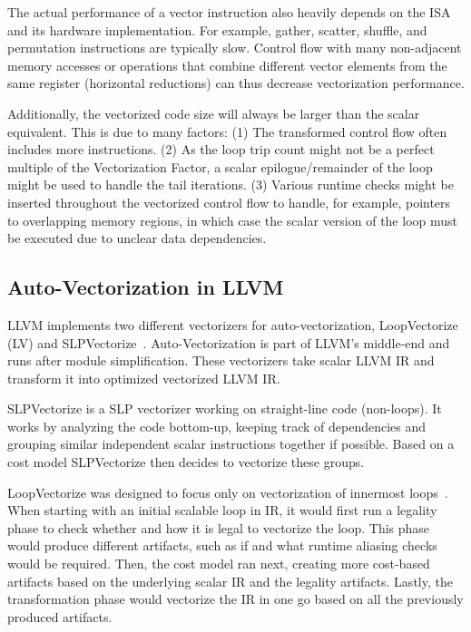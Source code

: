 \documentclass[sigplan,11pt,nonacm]{acmart}
\begin{document}
The actual performance of a vector instruction also heavily depends on the ISA and its 
hardware implementation. 
For example, gather, scatter, 
shuffle, and permutation instructions are typically slow. Control flow with many 
non-adjacent memory accesses or 
operations that combine different vector elements from the same register (horizontal reductions) can thus 
decrease vectorization performance.

Additionally, the vectorized code size will always be larger than the scalar equivalent. This is
due to many factors: (1) The transformed control flow often includes more instructions.
(2) As the loop trip count might not be a perfect multiple of the Vectorization Factor, a scalar
epilogue/remainder of the loop might be used to handle the tail iterations. (3) Various runtime
checks might be inserted throughout the vectorized control flow to handle, for example, pointers 
to overlapping memory regions, in which case the scalar version of the loop must be executed due to 
unclear data dependencies.

\subsection{Auto-Vectorization in LLVM}
LLVM implements two different vectorizers for auto-vectorization, LoopVectorize (LV)
and SLPVectorize~\cite{llvmvec,llvmhistorystate}. Auto-Vectorization is part of LLVM's 
middle-end and runs after module simplification.
These vectorizers take scalar LLVM IR and transform it into optimized vectorized 
LLVM IR.

SLPVectorize is a SLP vectorizer working on straight-line code (non-loops). It works by analyzing
the code bottom-up, keeping track of dependencies and grouping similar independent scalar instructions
together if possible. Based on a cost model SLPVectorize then decides to vectorize these groups.

LoopVectorize was designed to focus only on vectorization of innermost loops~\cite{llvmintrvplan}. 
When starting with an initial scalable loop in IR, it would first run a legality phase to check 
whether and how it is legal to vectorize the loop. This phase would produce different artifacts, 
such as if 
and what runtime aliasing checks would be required. Then, the cost model ran next, creating more 
cost-based artifacts based on the underlying scalar IR and the legality artifacts. 
Lastly, the transformation phase would vectorize 
the IR in one go based on all the previously produced artifacts.
\end{document}
